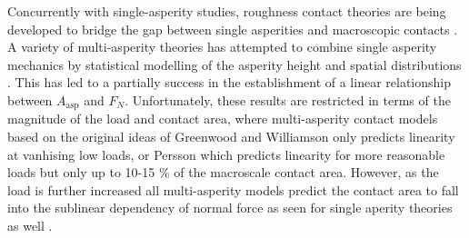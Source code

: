 
Concurrently with single-asperity studies, roughness contact theories are being developed \cite{PhysRevLett.100.055504,Persson,GW,BUSH197587} to bridge the gap between single asperities and macroscopic contacts \cite{mo_friction_2009}. A variety of multi-asperity theories has attempted to combine single asperity
mechanics by statistical modelling of the asperity height and spatial
distributions \cite{CARBONE20082555}. This has led to a partially success in the establishment of a linear relationship between $A_{\text{asp}}$ and $F_N$. Unfortunately, these results are restricted
in terms of the magnitude of the load and contact area, where multi-asperity
contact models based on the original ideas of Greenwood and Williamson \cite{GW}
only predicts linearity at vanhising low loads, or Persson \cite{Persson} which predicts linearity for more reasonable loads but only up to 10-15 \% of the macroscale contact area. However, as the load is further increased all multi-asperity models
predict the contact area to fall into the sublinear dependency of normal force
as seen for single aperity theories as well \cite{CARBONE20082555}.







